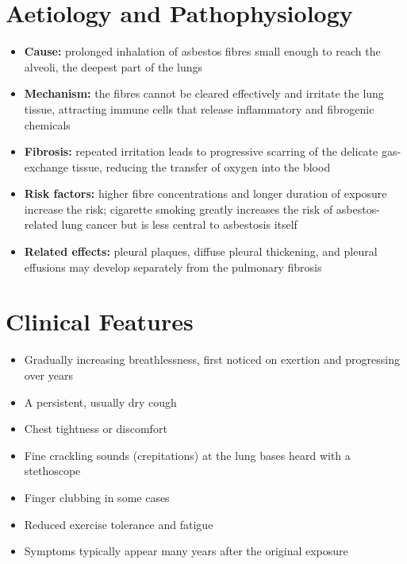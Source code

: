 \section*{Aetiology and Pathophysiology}
\begin{itemize}
    \item \textbf{Cause:} prolonged inhalation of asbestos fibres small enough to reach the alveoli, the deepest part of the lungs
    \item \textbf{Mechanism:} the fibres cannot be cleared effectively and irritate the lung tissue, attracting immune cells that release inflammatory and fibrogenic chemicals
    \item \textbf{Fibrosis:} repeated irritation leads to progressive scarring of the delicate gas-exchange tissue, reducing the transfer of oxygen into the blood
    \item \textbf{Risk factors:} higher fibre concentrations and longer duration of exposure increase the risk; cigarette smoking greatly increases the risk of asbestos-related lung cancer but is less central to asbestosis itself
    \item \textbf{Related effects:} pleural plaques, diffuse pleural thickening, and pleural effusions may develop separately from the pulmonary fibrosis
\end{itemize}

\section*{Clinical Features}
\begin{itemize}
    \item Gradually increasing breathlessness, first noticed on exertion and progressing over years
    \item A persistent, usually dry cough
    \item Chest tightness or discomfort
    \item Fine crackling sounds (crepitations) at the lung bases heard with a stethoscope
    \item Finger clubbing in some cases
    \item Reduced exercise tolerance and fatigue
    \item Symptoms typically appear many years after the original exposure
\end{itemize}

